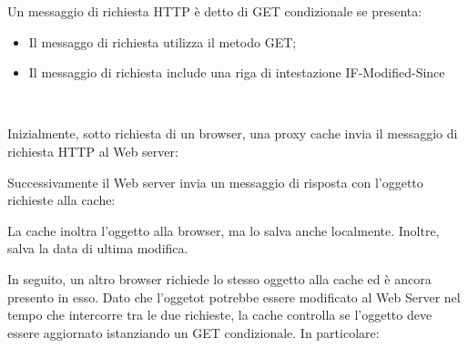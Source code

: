 \documentclass{book}
\begin{document}
Un messaggio di richiesta HTTP {\`e} detto di GET condizionale se presenta:
\begin{itemize}
  \item Il messaggo di richiesta utilizza il metodo GET;
  
  \item Il messaggio di richiesta include una riga di intestazione
  IF-Modified-Since
\end{itemize}
\begin{example}
  \
  
  Inizialmente, sotto richiesta di un browser, una proxy cache invia il
  messaggio di richiesta HTTP al Web server:
  
  {}
  
  Successivamente il Web server invia un messaggio di risposta con l'oggetto
  richieste alla cache:
  
  {}
  
  La cache inoltra l'oggetto alla browser, ma lo salva anche localmente.
  Inoltre, salva la data di ultima modifica.
  
  In seguito, un altro browser richiede lo stesso oggetto alla cache ed {\`e}
  ancora presento in esso. Dato che l'oggetot potrebbe essere modificato al
  Web Server nel tempo che intercorre tra le due richieste, la cache controlla
  se l'oggetto deve essere aggiornato istanziando un GET condizionale. In
  particolare:
  
  {}
  

\end{example}
\end{document}
